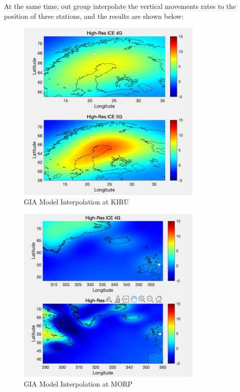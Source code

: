 \documentclass{article}
\begin{document}
At the same time, out group interpolate the vertical movements rates to the position of three stations, and the results are shown below:
\begin{figure}[H]
  \centering
  \includegraphics[width=9cm]{../result/ice/KIRU.png}
  \captionsetup{skip=0.2cm}
  \caption{GIA Model Interpolation at KIRU}
  \label{fig:GIA_KIRU}
\end{figure}
\begin{figure}[H]
  \centering
  \includegraphics[width=9cm]{../result/ice/MORP.png}
  \captionsetup{skip=0.2cm}
  \caption{GIA Model Interpolation at MORP}
  \label{fig:GIA_MORP}
\end{figure}
\end{document}
